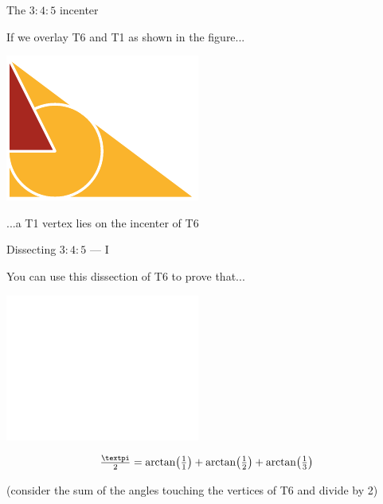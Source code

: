 \documentclass[14pt]{beamer}
\begin{document}

    \begin{frame}{The $3\!\!:\!\!4\!\!:\!\!5$ incenter}
        \begin{center}
            If we overlay T6 and T1 as shown in the figure...

            \bigskip \bigskip

            \includegraphics[height=18ex]{figures/figure006b.pdf}

            \bigskip \bigskip

            ...a T1 vertex lies on the incenter of T6
        \end{center}
    \end{frame}


    \begin{frame}{Dissecting $3\!\!:\!\!4\!\!:\!\!5$ --- I}
        \begin{center}
            You can use this dissection of T6 to prove that...

            \bigskip\bigskip

            \includegraphics[height=18ex]{figures/figure006c.pdf}\vspace{-1em}

            $$\tfrac{\text{\textpi}}{2} = \arctan{\!\left(\tfrac{1}{1}\right)} + \arctan{\!\left(\tfrac{1}{2}\right)} + \arctan{\!\left(\tfrac{1}{3}\right)}$$

            {\footnotesize(consider the sum of the angles touching the vertices of T6 and divide by 2)}
        \end{center}
    \end{frame}
\end{document}
